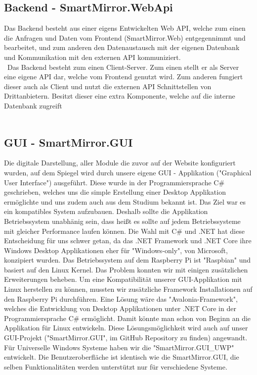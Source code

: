 \subsection{Backend - SmartMirror.WebApi}
Das Backend besteht aus einer eigens Entwickelten Web API, welche zum einen die Anfragen und Daten vom Frontend (SmartMirror.Web) entgegennimmt und bearbeitet, und zum anderen den Datenaustausch mit der eigenen Datenbank und Kommunikation mit den externen API kommuniziert.\\\
Das Backend besteht zum einen Client-Server. Zum einen stellt er als Server eine eigene API dar, welche vom Frontend genutzt wird. Zum anderen fungiert dieser auch als Client und nutzt die externen API Schnittstellen von Drittanbietern. Besitzt dieser eine extra Komponente, welche auf die interne Datenbank zugreift\\\
\subsection{GUI - SmartMirror.GUI}
Die digitale Darstellung, aller Module die zuvor auf der Website konfiguriert wurden, auf dem Spiegel wird durch unsere eigene GUI - Applikation ("Graphical User Interface") ausgeführt. Diese wurde in der Programmiersprache C\# geschrieben, welches uns die simple Erstellung einer Desktop Applikation ermöglichte und uns zudem auch aus dem Studium bekannt ist. 
Das Ziel war es ein kompatibles System aufzubauen. Deshalb sollte die Applikation Betriebssystem unabhänig sein, dass heißt es sollte auf jedem Betriebssysteme mit gleicher Performance laufen können. Die Wahl mit C\# und .NET hat diese Entscheidung für uns schwer getan, da das .NET Framework und .NET Core ihre Windows Desktop Applikationen eher für "Windows-only", von Microsoft, konzipiert wurden. Das Betriebssystem auf dem Raspberry Pi ist "Raspbian" und basiert auf den Linux Kernel. Das Problem konnten wir mit einigen zusätzlichen Erweiterungen beheben. Um eine Kompatibilität unserer GUI-Applikation mit Linux herstellen zu können, mussten wir zusätzliche Framework Installationen auf den Raspberry Pi durchführen. 
Eine Lösung wäre das "Avalonia-Framework", welches die Entwicklung von Desktop Applikationen unter .NET Core in der Programmiersprache C\# ermöglicht. Damit könnte man schon von Beginn an die Applikation für Linux entwickeln. Diese Lösungsmöglichkeit wird auch auf unser GUI-Projekt ("SmartMirror.GUI", im GitHub Repository zu finden) angewandt. 
Für Universelle Windows Systeme haben wir die "SmartMirror.GUI\_UWP" entwickelt. Die Benutzeroberfläche ist identisch wie die SmartMirror.GUI, die selben Funktionalitäten werden unterstützt nur für verschiedene Systeme.


